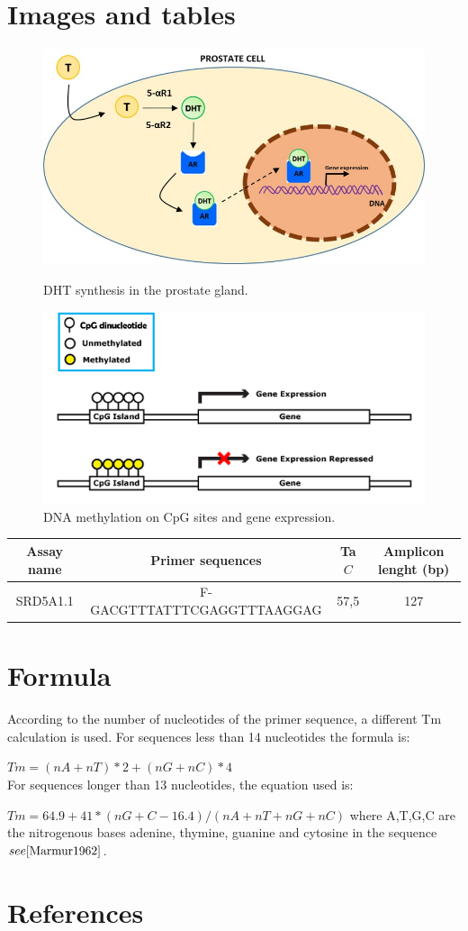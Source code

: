 \documentclass[a4paper,11pt]{article}
\begin{document}
\section{Images and tables} \begin{figure}

	\includegraphics[scale=0.6]{Imagen_DHT}
	\caption{DHT synthesis in the prostate gland.} \label{Imagen_DHT}
	\includegraphics[scale=0.6]{Imagen_DNAmeth}
	\caption{DNA methylation on CpG sites and gene expression.} \label{Imagen_DNAmeth} \end{figure}

\begin{tabular}{|c|c|c|c|}
	\hline
	Assay name & Primer sequences & Ta \( C \)  & Amplicon lenght (bp) \\
	\hline
	SRD5A1.1 & F-GACGTTTATTTCGAGGTTTAAGGAG & 57,5 & 127 \\
	\hline
	\end{tabular}

\section{Formula}
According to the number of nucleotides of the primer sequence, a different Tm calculation is used. 
For sequences less than 14 nucleotides the formula is:

$Tm= (n  A+nT) * 2 + (nG+nC) * 4$
\\ For sequences longer than 13 nucleotides, the equation used is:

$Tm= 64.9 + 41*(nG+C-16.4)/(nA+nT+nG+nC)$
where A,T,G,C are the nitrogenous bases adenine, thymine, guanine and cytosine in the sequence \(see \cite{Marmur1962} \).


\section{References}
 
\end{document}
